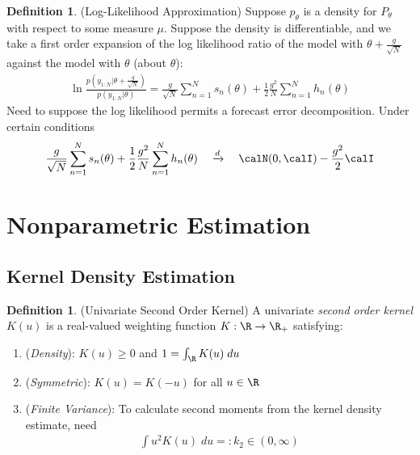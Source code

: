 \documentclass[12pt]{article}
\theoremstyle{plain}
\theoremstyle{definition}
\newtheorem{defn}[thm]{Definition}
\theoremstyle{remark}
\newcommand{\ra}{\rightarrow}
\newcommand{\dto}{\xrightarrow{d}}
\newcommand{\sumnN}{\sum^N_{n=1}}
\begin{document}
\begin{defn}(Log-Likelihood Approximation)
Suppose $p_\theta$ is a density for $P_\theta$ with respect to some
measure $\mu$. Suppose the density is differentiable,
and we take a first order expansion of the log likelihood ratio of the
model with $\theta+\frac{g}{\sqrt{N}}$ against the model with $\theta$
(about $\theta$):
\begin{align*}
  \ln\frac{p(y_{1:N}|\theta+\frac{g}{\sqrt{N}})}{p(y_{1:N}|\theta)}
  =
  \frac{g}{\sqrt{N}}
  \sumnN s_n(\theta)
  +
  \frac{1}{2}\frac{g^2}{N}
  \sumnN
  h_n(\theta)
\end{align*}
Need to suppose the log likelihood permits a forecast error
decomposition.
Under certain conditions
\begin{align*}
  \frac{g}{\sqrt{N}}
  \sumnN s_n(\theta)
  +
  \frac{1}{2}\frac{g^2}{N}
  \sumnN
  h_n(\theta)
  \quad\dto\quad
  \calN(0,\calI)
  -\frac{g^2}{2}
  \calI
\end{align*}
\end{defn}


\clearpage
\section{Nonparametric Estimation}


\subsection{Kernel Density Estimation}

\begin{defn}(Univariate Second Order Kernel)
A univariate \emph{second order kernel} $K(u)$ is a real-valued
weighting function $K:\R\ra\R_+$ satisfying:
\begin{enumerate}[label=(\roman*)]
  \item (\emph{Density}): $K(u)\geq 0$ and
    $1=\int_\R K(u)\;du$
  \item (\emph{Symmetric}): $K(u)=K(-u)$ for all $u\in\R$
  \item (\emph{Finite Variance}): To calculate second moments from
    the kernel density estimate, need
    \begin{align*}
      \int u^2 K(u)\;du =: k_2 \in (0,\infty)
    \end{align*}
\end{enumerate}
\end{defn}
\end{document}
